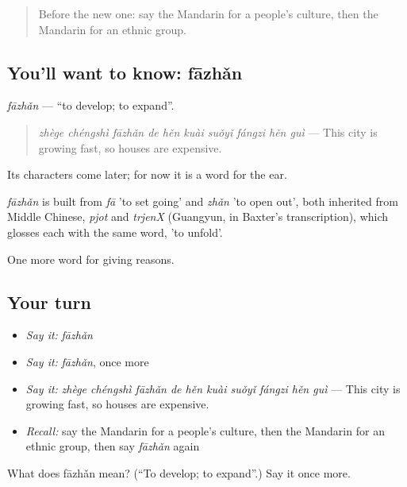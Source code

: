 \label{lesson:ZH-C374-fazhan}



\begin{quote}
Before the new one: say the Mandarin for a people's culture, then the Mandarin for an ethnic group.
\end{quote}

\subsection*{You'll want to know: fāzhǎn}
\emph{fāzhǎn} — \textquotedblleft{}to develop; to expand\textquotedblright{}.

\begin{quote}
\emph{zhège chéngshì fāzhǎn de hěn kuài suǒyǐ fángzi hěn guì} — This city is growing fast, so houses are expensive.
\end{quote}

Its characters come later; for now it is a word for the ear.

\begin{cousinweb}
\emph{fāzhǎn} is built from \emph{fā} 'to set going' and \emph{zhǎn} 'to open out', both inherited from Middle Chinese, \emph{pjot} and \emph{trjenX} (Guangyun, in Baxter's transcription), which glosses each with the same word, 'to unfold'.
\end{cousinweb}

\begin{grammarlens}[title={What you've built}]
One more word for giving reasons.
\end{grammarlens}

\subsection*{Your turn}
\begin{itemize}
\raggedright
  \item \emph{Say it:} \emph{fāzhǎn}
  \item \emph{Say it:} \emph{fāzhǎn}, once more
  \item \emph{Say it:} \emph{zhège chéngshì fāzhǎn de hěn kuài suǒyǐ fángzi hěn guì} — This city is growing fast, so houses are expensive.
  \item \emph{Recall:} say the Mandarin for a people's culture, then the Mandarin for an ethnic group, then say \emph{fāzhǎn} again
\end{itemize}

\begin{tcolorbox}[breakable,colback=teal!4,colframe=teal!35!black,title={Before you move on}]
What does fāzhǎn mean? (\textquotedblleft{}To develop; to expand\textquotedblright{}.) Say it once more.
\end{tcolorbox}
